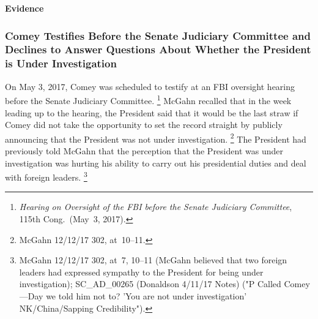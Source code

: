 \begin{center}
\textbf{Evidence}
\end{center}

\subsubsection{Comey Testifies Before the Senate Judiciary Committee and Declines to Answer Questions About Whether the President is Under Investigation}

On May 3, 2017, Comey was scheduled to testify at an FBI oversight hearing before the Senate Judiciary Committee.%
\footnote{\textit{Hearing on Oversight of the FBI before the Senate Judiciary Committee}, 115th Cong.\ (May~3, 2017).}
McGahn recalled that in the week leading up to the hearing, the President said that it would be the last straw if Comey did not take the opportunity to set the record straight by publicly announcing that the President was not under investigation.%
\footnote{McGahn 12/12/17 302, at~10--11.}
The President had previously told McGahn that the perception that the President was under investigation was hurting his ability to carry out his presidential duties and deal with foreign leaders.%
\footnote{McGahn 12/12/17 302, at~7, 10--11 (McGahn believed that two foreign leaders had expressed sympathy to the President for being under investigation);
SC\_AD\_00265 (Donaldson 4/11/17 Notes) ("P Called Comey---Day we told him not to? 'You are not under investigation' NK/China/Sapping Credibility").}
